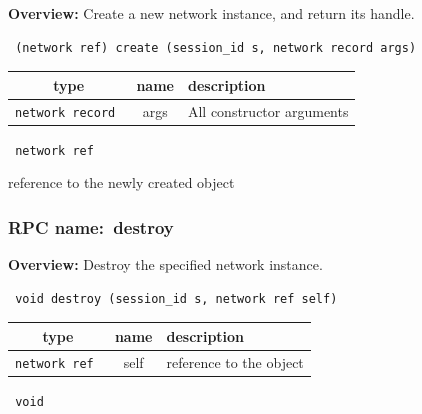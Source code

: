 {\bf Overview:} 
Create a new network instance, and return its handle.

\begin{verbatim} (network ref) create (session_id s, network record args)\end{verbatim}



 
\vspace{0.3cm}
\begin{tabular}{|c|c|p{7cm}|}
 \hline
{\bf type} & {\bf name} & {\bf description} \\ \hline
{\tt network record } & args & All constructor arguments \\ \hline 

\end{tabular}

\vspace{0.3cm}

{\tt 
network ref
}


reference to the newly created object
\vspace{0.3cm}
\vspace{0.3cm}
\vspace{0.3cm}
\subsubsection{RPC name:~destroy}

{\bf Overview:} 
Destroy the specified network instance.

\begin{verbatim} void destroy (session_id s, network ref self)\end{verbatim}



 
\vspace{0.3cm}
\begin{tabular}{|c|c|p{7cm}|}
 \hline
{\bf type} & {\bf name} & {\bf description} \\ \hline
{\tt network ref } & self & reference to the object \\ \hline 

\end{tabular}

\vspace{0.3cm}

{\tt 
void
}



